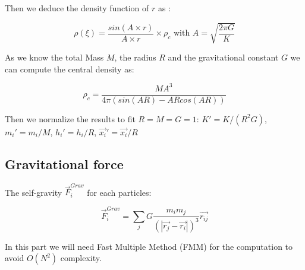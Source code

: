 \documentclass[notes.tex]{subfiles}
\begin{document}
Then we deduce the density function of $r$ as :

$$\rho(\xi) = \frac{sin(A\times r)}{A \times r} \times \rho_c \mbox{ with } A = \sqrt{\frac{2\pi G}{K}}
$$

As we know the total Mass $M$, the radius $R$ and the gravitational constant $G$ we can compute the central density as:

$$ \rho_c = \frac{M A^3}{4 \pi (sin(AR)-ARcos(AR)) } $$

Then we normalize the results to fit $R = M = G = 1$: $K' = K/(R^2G) $, $m_i' = m_i/M $, $h_i' = h_i / R$, $\vec{x_i}' = \vec{x_i}/R$


\subsection{Gravitational force}

The self-gravity $\vec{F}_i^{Grav}$ for each particles:

\begin{equation}
\vec{F}_i^{Grav} = \sum_j G\frac{m_im_j}{(|\vec{r_j}-\vec{r_i}|)^3} \vec{r_{ij}}
\end{equation}

In this part we will need Fast Multiple Method (FMM) for the computation to avoid $O(N^2)$ complexity.
\end{document}
